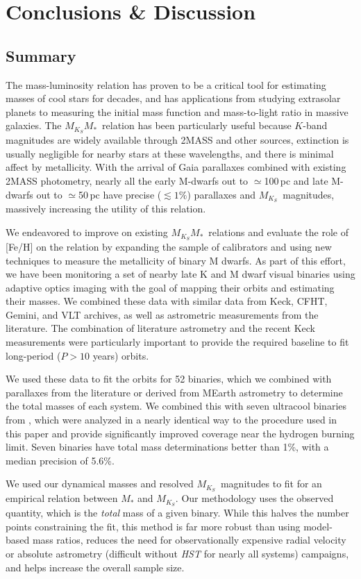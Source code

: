 \documentclass[twocolumn]{aastex62}
\newcommand{\mks}{$M_{K_S}$}
\newcommand{\mmk}{$M_{K_S}$\textendash$M_*$}
\begin{document}
\section{Conclusions \& Discussion}\label{sec:discussion} 

\subsection{Summary}
The mass-luminosity relation has proven to be a critical tool for estimating masses of cool stars for decades, and has applications from studying extrasolar planets to measuring the initial mass function and mass-to-light ratio in massive galaxies. The \mmk\ relation has been particularly useful because $K$-band magnitudes are widely available through 2MASS and other sources, extinction is usually negligible for nearby stars at these wavelengths, and there is minimal affect by metallicity. With the arrival of Gaia parallaxes combined with existing 2MASS photometry, nearly all the early M-dwarfs out to $\simeq$100\,pc and late M-dwarfs out to $\simeq$50\,pc have precise ($\lesssim1\%$) parallaxes and \mks\ magnitudes, massively increasing the utility of this relation. 

We endeavored to improve on existing \mmk\ relations and evaluate the role of [Fe/H] on the relation by expanding the sample of calibrators and using new techniques to measure the metallicity of binary M dwarfs. As part of this effort, we have been monitoring a set of nearby late K and M dwarf visual binaries using adaptive optics imaging with the goal of mapping their orbits and estimating their masses. We combined these data with similar data from Keck, CFHT, Gemini, and VLT archives, as well as astrometric measurements from the literature. The combination of literature astrometry and the recent Keck measurements were particularly important to provide the required baseline to fit long-period ($P>10$ years) orbits. 

We used these data to fit the orbits for 52 binaries, which we combined with parallaxes from the literature or derived from MEarth astrometry to determine the total masses of each system. We combined this with seven ultracool binaries from \citep{Dupuy2017}, which were analyzed in a nearly identical way to the procedure used in this paper and provide significantly improved coverage near the hydrogen burning limit. Seven binaries have total mass determinations better than 1\%, with a median precision of 5.6\%.

We used our dynamical masses and resolved \mks\ magnitudes to fit for an empirical relation between $M_*$ and \mks. Our methodology uses the observed quantity, which is the {\it total} mass of a given binary. While this halves the number points constraining the fit, this method is far more robust than using model-based mass ratios, reduces the need for observationally expensive radial velocity or absolute astrometry (difficult without {\it HST} for nearly all systems) campaigns, and helps increase the overall sample size. 
\end{document}
